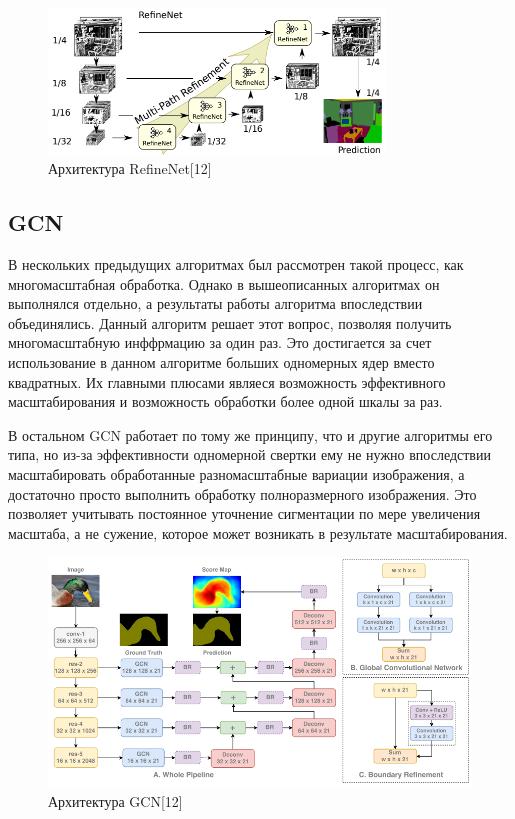 \documentclass[bachelor, och, coursework]{shiza}
\begin{document}
\begin{figure}[H]
    \centering
    \includegraphics[width=0.8\textwidth]{13}
    \caption{Архитектура RefineNet[12]}
    \label{fig:img1}
\end{figure}

\subsection{GCN}

В нескольких предыдущих алгоритмах был рассмотрен такой процесс, как многомасштабная обработка. Однако в вышеописанных алгоритмах он выполнялся отдельно, а
результаты работы алгоритма впоследствии объединялись. Данный алгоритм решает этот вопрос, позволяя получить многомасштабную инффрмацию за один раз. Это
достигается за счет использование в данном алгоритме больших одномерных ядер вместо квадратных. Их главными плюсами являеся возможность эффективного масштабирования
и возможность обработки более одной шкалы за раз.

В остальном GCN работает по тому же принципу, что и другие алгоритмы его типа, но из-за эффективности одномерной свертки ему не нужно впоследствии масштабировать
обработанные разномасштабные вариации изображения, а достаточно просто выполнить обработку полноразмерного изображения. Это позволяет учитывать постоянное уточнение
сигментации по мере увеличения масштаба, а не сужение, которое может возникать в результате масштабирования.
\begin{figure}[H]
    \centering
    \includegraphics[width=1\textwidth]{14}
    \caption{Архитектура GCN[12]}
    \label{fig:img1}
\end{figure}
\end{document}
